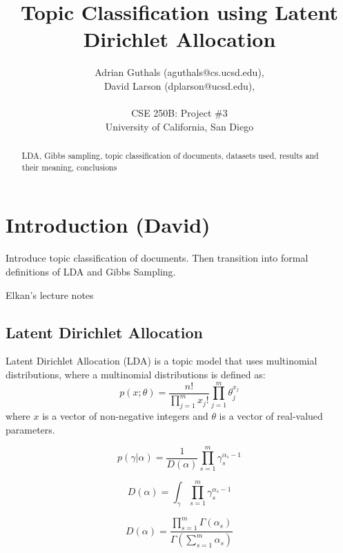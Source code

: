 \documentclass[10pt]{article}
\title{Topic Classification using Latent Dirichlet Allocation}
\author{Adrian Guthals (aguthals@cs.ucsd.edu),\\
David Larson (dplarson@ucsd.edu),\\
\\
CSE 250B: Project \#3 \\
University of California, San Diego \\
}
\begin{document}
\maketitle


\begin{abstract}
LDA, Gibbs sampling, topic classification of documents, datasets used, results and their meaning, conclusions
\end{abstract}



\section{Introduction (David)}
\label{sec:intro}

Introduce topic classification of documents. Then transition into formal definitions of LDA and Gibbs Sampling.

Elkan's lecture notes \cite{CSE250B}


\subsection{Latent Dirichlet Allocation}
\label{sec:lda}

Latent Dirichlet Allocation (LDA) is a topic model that uses multinomial distributions, where a multinomial distributions is defined as:
\begin{equation}
    p(x;\theta) = \frac{n!}{\prod_{j=1}^m x_j !} \prod_{j=1}^m \theta_j^{x_j}
\end{equation}
where $x$ is a vector of non-negative integers and $\theta$ is a vector of real-valued parameters.


\begin{equation}
    p(\gamma | \alpha) = \frac{1}{D(\alpha)} \prod_{s=1}^{m} \gamma_{s}^{\alpha_s - 1}
\end{equation}

\begin{equation}
    D(\alpha) = \int_{\gamma} \prod_{s=1}^m \gamma_s^{\alpha_s - 1}
\end{equation}

\begin{equation}
    D(\alpha) = \frac{\prod_{s=1}^m \Gamma(\alpha_s)}{\Gamma (\sum_{s=1}^m \alpha_s )}
\end{equation}
\end{document}

